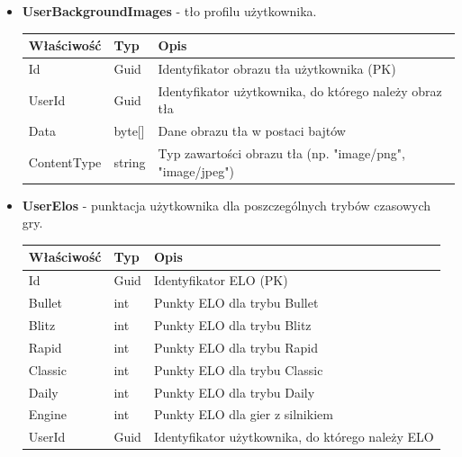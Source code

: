 \documentclass[12pt,a4paper]{article}
\begin{document}
\begin{itemize}
    \item \textbf{UserBackgroundImages} - tło profilu użytkownika.
    \begin{longtable}{|m{4cm}|m{2cm}|m{8cm}|}
        \hline
        \textbf{Właściwość} & \textbf{Typ} & \textbf{Opis} \\ \hline
        \endhead
        \hline
        Id & Guid & Identyfikator obrazu tła użytkownika (PK) \\ \hline
        UserId & Guid & Identyfikator użytkownika, do którego należy obraz tła \\ \hline
        Data & byte[] & Dane obrazu tła w postaci bajtów \\ \hline
        ContentType & string & Typ zawartości obrazu tła (np. "image/png", "image/jpeg") \\ \hline
    \end{longtable}
        
    \item \textbf{UserElos} - punktacja użytkownika dla poszczególnych trybów czasowych gry.
    \begin{longtable}{|m{4cm}|m{2cm}|m{8cm}|}
        \hline
        \textbf{Właściwość} & \textbf{Typ} & \textbf{Opis} \\ \hline
        \endhead
        \hline
        Id & Guid & Identyfikator ELO (PK) \\ \hline
        Bullet & int & Punkty ELO dla trybu Bullet \\ \hline
        Blitz & int & Punkty ELO dla trybu Blitz \\ \hline
        Rapid & int & Punkty ELO dla trybu Rapid \\ \hline
        Classic & int & Punkty ELO dla trybu Classic \\ \hline
        Daily & int & Punkty ELO dla trybu Daily \\ \hline
        Engine & int & Punkty ELO dla gier z silnikiem \\ \hline
        UserId & Guid & Identyfikator użytkownika, do którego należy ELO \\ \hline
    \end{longtable}
        

\end{itemize}
\end{document}
